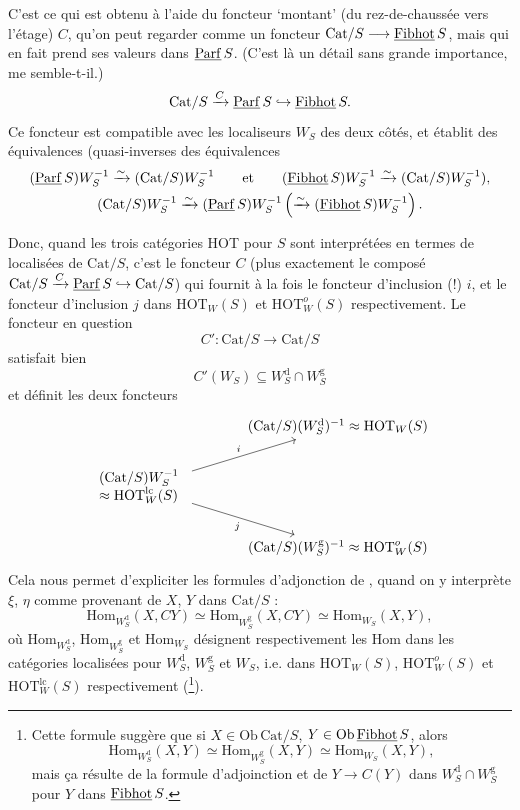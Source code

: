C’est ce qui est obtenu à l’aide du foncteur ‘montant’ (du rez-de-chaussée vers l’étage) $C$, qu’on peut regarder comme un foncteur $\mathrm{Cat}/S \longrightarrow \underline{\mathrm{Fibhot}}\,S$, mais qui en fait prend ses valeurs dans $\underline{\mathrm{Parf}}\,S$. (C’est là un détail sans grande importance, me semble-t-il.)
\[
\mathrm{Cat}/S \xrightarrow{C} \underline{\mathrm{Parf}}\,S \hookrightarrow \underline{\mathrm{Fibhot}}\,S.
\]
Ce foncteur est compatible avec les localiseurs $W_S$ des deux côtés, et établit des équivalences (quasi-inverses des équivalences
\[
\begin{gathered}
(\underline{\mathrm{Parf}}\,S)W_S^{-1} \xrightarrow{\sim} (\mathrm{Cat}/S)W_S^{-1} \qquad\text{et}\qquad (\underline{\mathrm{Fibhot}}\,S)W_S^{-1} \xrightarrow{\sim} (\mathrm{Cat}/S)W_S^{-1}),\\
(\mathrm{Cat}/S)W_S^{-1} \xrightarrow{\sim} (\underline{\mathrm{Parf}}\,S)W_S^{-1} \left( \xrightarrow{\sim} (\underline{\mathrm{Fibhot}}\,S)W_S^{-1} \right).
\end{gathered}
\]

Donc, quand les trois catégories HOT pour $S$ sont interprétées en termes de localisées de $\mathrm{Cat}/S$, c’est le foncteur $C$ (plus exactement le composé $\mathrm{Cat}/S \xrightarrow{C} \underline{\mathrm{Parf}}\,S \hookrightarrow \mathrm{Cat}/S$) qui fournit à la fois le foncteur d’inclusion (!) $i$, et le foncteur d’inclusion $j$ dans $\mathrm{HOT}_W(S)$ et $\mathrm{HOT}^{o}_{W}(S)$ respectivement. Le foncteur en question
\[
C' : \mathrm{Cat}/S \longrightarrow \mathrm{Cat}/S
\]
satisfait bien
\[
C'(W_S) \subseteq W_S^{\mathrm{d}} \cap W_S^{\mathrm{g}}
\]
et définit les deux foncteurs
\[
\begin{tikzcd}[column sep=large]
& (\mathrm{Cat}/S)(W_S^{\mathrm{d}})^{-1} \approx \mathrm{HOT}_W(S) \\
\begin{array}{l} (\mathrm{Cat}/S)W_S^{-1} \\ \approx \mathrm{HOT}^{\mathrm{lc}}_{W}(S) \end{array} \arrow[ur, "i"] \arrow[dr, "j"'] & \\
& (\mathrm{Cat}/S)(W_S^{\mathrm{g}})^{-1} \approx \mathrm{HOT}^{o}_{W}(S)
\end{tikzcd}
\]
Cela nous permet d’expliciter les formules d’adjonction de , quand on y interprète $\xi$, $\eta$
comme provenant de $X$, $Y$ dans $\mathrm{Cat}/S$ :
\[
\boxed{\mathrm{Hom}_{W_S^{\mathrm{d}}}(X,CY) \simeq \mathrm{Hom}_{W_S^{\mathrm{g}}}(X,CY) \simeq \mathrm{Hom}_{W_S}(X,Y),}
\]
où $\mathrm{Hom}_{W_S^{\mathrm{d}}}$, $\mathrm{Hom}_{W_S^{\mathrm{g}}}$ et $\mathrm{Hom}_{W_S}$ désignent respectivement les Hom dans les catégories localisées pour $W_S^{\mathrm{d}}$, $W_S^{\mathrm{g}}$ et $W_S$, i.e. dans $\mathrm{HOT}_W(S)$, $\mathrm{HOT}^{o}_{W}(S)$ et $\mathrm{HOT}^{\mathrm{lc}}_{W}(S)$ respectivement (\footnote[51]{Cette formule suggère que si $X \in \mathrm{Ob}\,\mathrm{Cat}/S$, $Y \in \mathrm{Ob}\,\underline{\mathrm{Fibhot}}\,S$, alors
\[
\mathrm{Hom}_{W_S^{\mathrm{d}}}(X,Y) \simeq \mathrm{Hom}_{W_S^{\mathrm{g}}}(X,Y) \simeq \mathrm{Hom}_{W_S}(X,Y),
\]
mais ça résulte de la formule d’adjoinction et de $Y \longrightarrow C(Y)$ dans $W_S^{\mathrm{d}} \cap W_S^{\mathrm{g}}$ pour $Y$ dans $\underline{\mathrm{Fibhot}}\,S$.}). %

